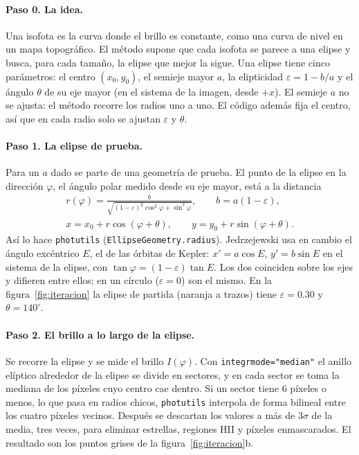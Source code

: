 \documentclass[11pt,a4paper]{article}
\newcommand{\code}[1]{\texttt{#1}}
\begin{document}
\paragraph{Paso 0. La idea.} Una isofota es la curva donde el brillo es constante, como una curva de nivel en un
mapa topográfico. El método supone que cada isofota se parece a una elipse y busca, para cada tamaño, la elipse
que mejor la sigue. Una elipse tiene cinco parámetros: el centro $(x_0, y_0)$, el semieje mayor $a$, la
elipticidad $\varepsilon = 1 - b/a$ y el ángulo $\theta$ de su eje mayor (en el sistema de la imagen, desde $+x$).
El semieje $a$ no se ajusta: el método recorre los radios uno a uno. El código además fija el centro, así que en
cada radio solo se ajustan $\varepsilon$ y $\theta$.

\paragraph{Paso 1. La elipse de prueba.} Para un $a$ dado se parte de una geometría de prueba. El punto de la
elipse en la dirección $\varphi$, el ángulo polar medido desde su eje mayor, está a la distancia
\begin{equation}
\begin{gathered}
r(\varphi) = \frac{b}{\sqrt{(1-\varepsilon)^2\cos^2\varphi + \sin^2\varphi}}, \qquad b = a(1-\varepsilon), \\
x = x_0 + r\cos(\varphi + \theta), \qquad y = y_0 + r\sin(\varphi + \theta).
\end{gathered}
\end{equation}
Así lo hace \code{photutils} (\code{EllipseGeometry.radius}). Jedrzejewski usa en cambio el ángulo excéntrico
$E$, el de las órbitas de Kepler: $x' = a\cos E$, $y' = b\sin E$ en el sistema de la elipse, con
$\tan\varphi = (1-\varepsilon)\tan E$. Los dos coinciden sobre los ejes y difieren entre ellos; en un círculo
($\varepsilon = 0$) son el mismo.
En la figura~\ref{fig:iteracion} la elipse de partida (naranja a trazos) tiene $\varepsilon = 0.30$ y
$\theta = 140^\circ$.

\paragraph{Paso 2. El brillo a lo largo de la elipse.} Se recorre la elipse y se mide el brillo $I(\varphi)$.
Con \code{integrmode="median"} el anillo elíptico alrededor de la elipse se divide en sectores, y en cada sector
se toma la mediana de los píxeles cuyo centro cae dentro. Si un sector tiene 6 píxeles o menos, lo que pasa en
radios chicos, \code{photutils} interpola de forma bilineal entre los cuatro píxeles vecinos. Después se
descartan los valores a más de $3\sigma$ de la media, tres veces, para eliminar estrellas, regiones HII y
píxeles enmascarados. El resultado son los puntos grises de la figura~\ref{fig:iteracion}b.
\end{document}
